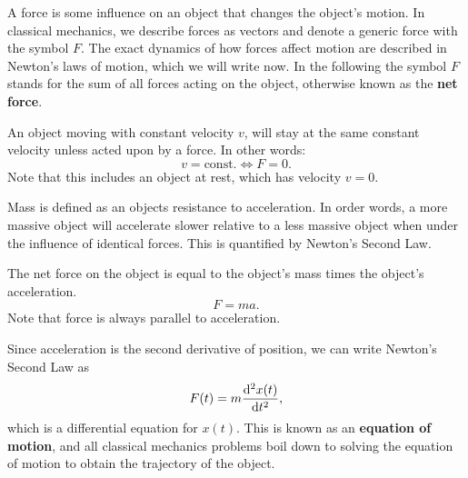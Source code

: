 \documentclass[../classical_mechanics.tex]{subfiles}
\begin{document}
        A force is some influence on an object that changes the object's motion.
        In classical mechanics, we describe forces as vectors and denote a generic force with the symbol $F$.
        The exact dynamics of how forces affect motion are described in Newton's laws of motion, which we will write now.
        In the following the symbol $F$ stands for the sum of all forces acting on the object, otherwise known as the \textbf{net force}.
        \begin{definition}\label{def:newton-1}
            An object moving with constant velocity $v$, will stay at the same constant velocity unless acted upon by a force.
            In other words:
            \begin{equation}
                v=\text{const.}\iff F=0.
            \end{equation}
            Note that this includes an object at rest, which has velocity $v=0$.
        \end{definition}
        Mass is defined as an objects resistance to acceleration.
        In order words, a more massive object will accelerate slower relative to a less massive object when under the influence of identical forces.
        This is quantified by Newton's Second Law.
        \begin{definition}\label{def:newton-2}
            The net force on the object is equal to the object's mass times the object's acceleration.
            \begin{equation}
                F=ma.
            \end{equation}
            Note that force is always parallel to acceleration.
        \end{definition}
        Since acceleration is the second derivative of position, we can write Newton's Second Law as
        \begin{equation}
            F(t)=m\dv[2]{x(t)}{t},
        \end{equation}
        which is a differential equation for $x(t)$.
        This is known as an \textbf{equation of motion}, and all classical mechanics problems boil down to solving the equation of motion to obtain the trajectory of the object.
\end{document}
